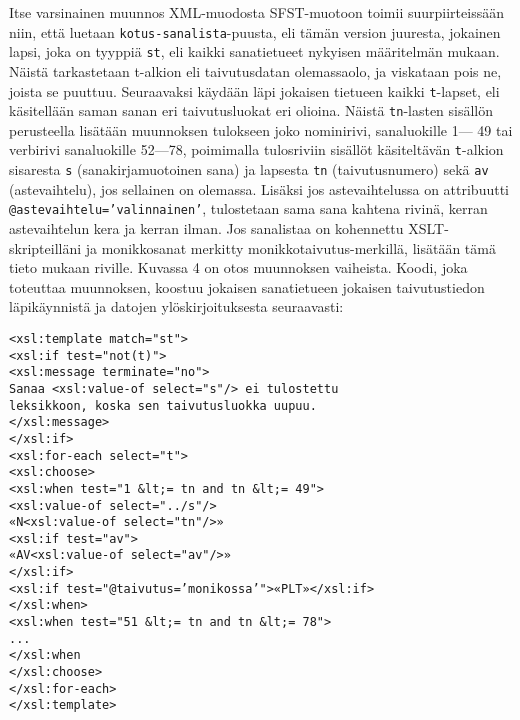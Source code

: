 \documentclass[free]{flammie}
\begin{document}
Itse varsinainen muunnos XML-muodosta SFST-muotoon toimii suurpiirteissään
niin, että luetaan \texttt{kotus-sanalista}-puusta, eli tämän version juuresta,
jokainen lapsi, joka on tyyppiä \texttt{st}, eli kaikki sanatietueet nykyisen määritelmän mukaan. Näistä tarkastetaan t-alkion eli taivutusdatan olemassaolo, ja viskataan pois
ne, joista se puuttuu. Seuraavaksi käydään läpi jokaisen tietueen kaikki
\texttt{t}-lapset,
eli käsitellään saman sanan eri taivutusluokat eri olioina. Näistä \texttt{tn}-lasten sisällön perusteella lisätään muunnoksen tulokseen joko nominirivi, sanaluokille 1—
49 tai verbirivi sanaluokille 52—78, poimimalla tulosriviin sisällöt käsiteltävän
\texttt{t}-alkion sisaresta \texttt{s} (sanakirjamuotoinen sana) ja lapsesta
\texttt{tn} (taivutusnumero)
sekä \texttt{av} (astevaihtelu), jos sellainen on olemassa. Lisäksi jos astevaihtelussa on
attribuutti \texttt{@astevaihtelu=’valinnainen’}, tulostetaan sama sana kahtena rivinä, kerran astevaihtelun kera ja kerran ilman. Jos sanalistaa on kohennettu
XSLT-skripteilläni ja monikkosanat merkitty monikkotaivutus-merkillä, lisätään
tämä tieto mukaan riville. Kuvassa 4 on otos muunnoksen vaiheista. Koodi, joka toteuttaa muunnoksen, koostuu jokaisen sanatietueen jokaisen taivutustiedon
läpikäynnistä ja datojen ylöskirjoituksesta seuraavasti:

\begin{verbatim}
<xsl:template match="st">
<xsl:if test="not(t)">
<xsl:message terminate="no">
Sanaa <xsl:value-of select="s"/> ei tulostettu
leksikkoon, koska sen taivutusluokka uupuu.
</xsl:message>
</xsl:if>
<xsl:for-each select="t">
<xsl:choose>
<xsl:when test="1 &lt;= tn and tn &lt;= 49">
<xsl:value-of select="../s"/>
«N<xsl:value-of select="tn"/>»
<xsl:if test="av">
«AV<xsl:value-of select="av"/>»
</xsl:if>
<xsl:if test="@taivutus=’monikossa’">«PLT»</xsl:if>
</xsl:when>
<xsl:when test="51 &lt;= tn and tn &lt;= 78">
...
</xsl:when
</xsl:choose>
</xsl:for-each>
</xsl:template>
\end{verbatim}
\end{document}
